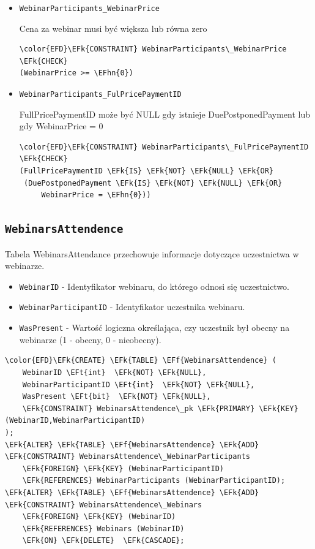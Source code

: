 \documentclass[11pt]{article}
\newcommand{\EFk}[1]{\textcolor{EFk}{\textbf{#1}}} %
\newcommand{\EFf}[1]{\textcolor{EFf}{#1}} %
\newcommand{\EFt}[1]{\textcolor{EFt}{\textbf{#1}}} %
\newcommand{\EFhn}[1]{\textcolor{EFhn}{#1}} %
\begin{document}
\begin{itemize}
\item \texttt{WebinarParticipants\_WebinarPrice}

Cena za webinar musi być większa lub równa zero
\begin{Code}
\begin{Verbatim}
\color{EFD}\EFk{CONSTRAINT} WebinarParticipants\_WebinarPrice \EFk{CHECK}
(WebinarPrice >= \EFhn{0})
\end{Verbatim}
\end{Code}
\item \texttt{WebinarParticipants\_FulPricePaymentID}

FullPricePaymentID może być NULL gdy istnieje DuePostponedPayment lub gdy WebinarPrice = 0
\begin{Code}
\begin{Verbatim}
\color{EFD}\EFk{CONSTRAINT} WebinarParticipants\_FulPricePaymentID \EFk{CHECK}
(FullPricePaymentID \EFk{IS} \EFk{NOT} \EFk{NULL} \EFk{OR}
 (DuePostponedPayment \EFk{IS} \EFk{NOT} \EFk{NULL} \EFk{OR}
     WebinarPrice = \EFhn{0}))
\end{Verbatim}
\end{Code}
\end{itemize}
\subsection{\texttt{WebinarsAttendence}}
\label{sec:org8c6867f}
Tabela WebinarsAttendance przechowuje informacje dotyczące uczestnictwa w webinarze.
\begin{itemize}
\item \texttt{WebinarID} - Identyfikator webinaru, do którego odnosi się uczestnictwo.
\item \texttt{WebinarParticipantID} - Identyfikator uczestnika webinaru.
\item \texttt{WasPresent} - Wartość logiczna określająca, czy uczestnik był obecny na webinarze (1 - obecny, 0 - nieobecny).
\end{itemize}
\begin{Code}
\begin{Verbatim}
\color{EFD}\EFk{CREATE} \EFk{TABLE} \EFf{WebinarsAttendence} (
    WebinarID \EFt{int}  \EFk{NOT} \EFk{NULL},
    WebinarParticipantID \EFt{int}  \EFk{NOT} \EFk{NULL},
    WasPresent \EFt{bit}  \EFk{NOT} \EFk{NULL},
    \EFk{CONSTRAINT} WebinarsAttendence\_pk \EFk{PRIMARY} \EFk{KEY}  (WebinarID,WebinarParticipantID)
);
\EFk{ALTER} \EFk{TABLE} \EFf{WebinarsAttendence} \EFk{ADD} \EFk{CONSTRAINT} WebinarsAttendence\_WebinarParticipants
    \EFk{FOREIGN} \EFk{KEY} (WebinarParticipantID)
    \EFk{REFERENCES} WebinarParticipants (WebinarParticipantID);
\EFk{ALTER} \EFk{TABLE} \EFf{WebinarsAttendence} \EFk{ADD} \EFk{CONSTRAINT} WebinarsAttendence\_Webinars
    \EFk{FOREIGN} \EFk{KEY} (WebinarID)
    \EFk{REFERENCES} Webinars (WebinarID)
    \EFk{ON} \EFk{DELETE}  \EFk{CASCADE};
\end{Verbatim}
\end{Code}
\end{document}
